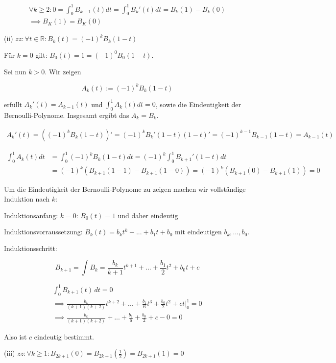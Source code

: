 \documentclass[]{article}
\begin{document}
\begin{align*}
\forall k \geq 2: 0 = \int_{0}^{1} B_{k-1}(t) dt = \int_{0}^{1} B_{k}'(t) dt = 	B_k(1) - B_k(0) \\
\implies B_K(1) = B_K(0)
\end{align*}

\noindent
(ii) $zz: \forall t \in \mathbb{R}: B_k(t) = (-1)^k B_k(1-t)$

Für $k=0$ gilt: $B_0(t) = 1 = (-1)^0 B_0(1-t)$.

Sei nun $k>0$. Wir zeigen

\[
A_k(t):=(-1)^k B_k(1-t)
\]

erfüllt $A_k'(t)=A_{k-1}(t)$ und $\int_{0}^{1}A_k(t)dt = 0$, sowie die Eindeutigkeit der Bernoulli-Polynome. Insgesamt ergibt das $A_k=B_k$.

\begin{align*}
	A_k'(t)=((-1)^k B_k(1-t))' = (-1)^k B_k'(1-t) (1-t)' = (-1)^{k-1} B_{k-1}(1-t) = A_{k-1}(t)
\end{align*}

\begin{align*}
	\int_{0}^{1}A_k(t)dt &= \int_{0}^{1}(-1)^kB_k(1-t)dt = (-1)^k \int_{0}^{1}B_{k+1}'(1-t)dt \\
	&= (-1)^k (B_{k+1}(1-1) - B_{k+1}(1-0)) = (-1)^k (B_{k+1}(0) - B_{k+1}(1)) = 0
\end{align*}

Um die Eindeutigkeit der Bernoulli-Polynome zu zeigen machen wir vollständige Induktion nach $k$:

Induktionsanfang: $k=0$: $B_0(t)=1$ und daher eindeutig

Induktionsvorraussetzung: $B_k(t)=b_k t^k + ... + b_1 t + b_0$ mit eindeutigen $b_k, ..., b_0$. 

Induktionsschritt:

\[
B_{k+1} = \int B_k = \frac{b_k}{k+1}t^{k+1} + ... + \frac{b_1}{2}t^2+b_0t+c
\]

\begin{align*}
	\int_{0}^{1}B_{k+1}(t) \,dt = 0 \\
	\implies \frac{b_k}{(k+1)(k+2)}t^{k+2} + ... + \frac{b_1}{6}t^3 + \frac{b_0}{2}t^2 + ct \Big|_{0}^{1} = 0 \\
	\implies \frac{b_k}{(k+1)(k+2)} + ... + \frac{b_1}{6} + \frac{b_0}{2} + c - 0 = 0
\end{align*}

Also ist $c$ eindeutig bestimmt.

\vspace{0.5cm}
(iii) $zz: \forall k \geq 1: B_{2k+1}(0) = B_{2k+1}(\frac{1}{2})=B_{2k+1}(1)=0$
\end{document}
